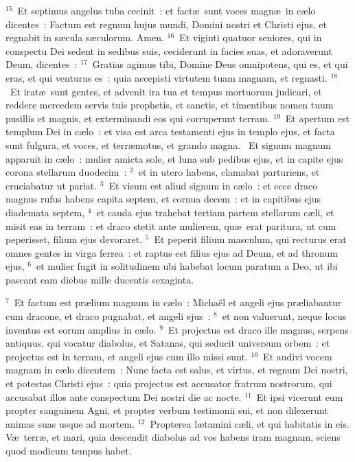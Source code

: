 ${}^{15}$~Et septimus angelus tuba cecinit~: et fact\ae\ sunt voces magn\ae\ in c\ae lo dicentes~: Factum est regnum hujus mundi, Domini nostri et Christi ejus, et regnabit in s\ae cula s\ae culorum. Amen.
${}^{16}$~Et viginti quatuor seniores, qui in conspectu Dei sedent in sedibus suis, ceciderunt in facies suas, et adoraverunt Deum, dicentes~:
${}^{17}$~Gratias agimus tibi, Domine Deus omnipotens, qui es, et qui eras, et qui venturus es~: quia accepisti virtutem tuam magnam, et regnasti.
${}^{18}$~Et irat\ae\ sunt gentes, et advenit ira tua et tempus mortuorum judicari, et reddere mercedem servis tuis prophetis, et sanctis, et timentibus nomen tuum pusillis et magnis, et exterminandi eos qui corruperunt terram.
${}^{19}$~Et apertum est templum Dei in c\ae lo~: et visa est arca testamenti ejus in templo ejus, et facta sunt fulgura, et voces, et terr\ae motus, et grando magna.
~Et signum magnum apparuit in c\ae lo~: mulier amicta sole, et luna sub pedibus ejus, et in capite ejus corona stellarum duodecim~:
${}^{2}$~et in utero habens, clamabat parturiens, et cruciabatur ut pariat.
${}^{3}$~Et visum est aliud signum in c\ae lo~: et ecce draco magnus rufus habens capita septem, et cornua decem~: et in capitibus ejus diademata septem,
${}^{4}$~et cauda ejus trahebat tertiam partem stellarum c\ae li, et misit eas in terram~: et draco stetit ante mulierem, qu\ae\ erat paritura, ut cum peperisset, filium ejus devoraret.
${}^{5}$~Et peperit filium masculum, qui recturus erat omnes gentes in virga ferrea~: et raptus est filius ejus ad Deum, et ad thronum ejus,
${}^{6}$~et mulier fugit in solitudinem ubi habebat locum paratum a Deo, ut ibi pascant eam diebus mille ducentis sexaginta.


${}^{7}$~Et factum est pr\ae lium magnum in c\ae lo~: Micha\"el et angeli ejus pr\ae liabantur cum dracone, et draco pugnabat, et angeli ejus~:
${}^{8}$~et non valuerunt, neque locus inventus est eorum amplius in c\ae lo.
${}^{9}$~Et projectus est draco ille magnus, serpens antiquus, qui vocatur diabolus, et Satanas, qui seducit universum orbem~: et projectus est in terram, et angeli ejus cum illo missi sunt.
${}^{10}$~Et audivi vocem magnam in c\ae lo dicentem~: Nunc facta est salus, et virtus, et regnum Dei nostri, et potestas Christi ejus~: quia projectus est accusator fratrum nostrorum, qui accusabat illos ante conspectum Dei nostri die ac nocte.
${}^{11}$~Et ipsi vicerunt eum propter sanguinem Agni, et propter verbum testimonii sui, et non dilexerunt animas suas usque ad mortem.
${}^{12}$~Propterea l\ae tamini c\ae li, et qui habitatis in eis. V\ae\ terr\ae , et mari, quia descendit diabolus ad vos habens iram magnam, sciens quod modicum tempus habet.


